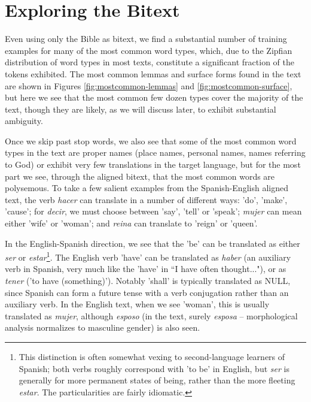 \section{Exploring the Bitext}
\label{sec:exploring}
Even using only the Bible as bitext, we find a substantial number of
training examples for many of the most common word types, which, due to the
Zipfian distribution of word types in most texts, constitute a significant
fraction of the tokens exhibited.
The most common lemmas and surface forms found in the text are shown in Figures
\ref{fig:mostcommon-lemmas} and \ref{fig:mostcommon-surface}, but here we see
that the most common few dozen types cover the majority of the text, though
they are likely, as we will discuss later, to exhibit substantial ambiguity.

Once we skip past stop words, we also see that some of the most common word
types in the text are proper names (place names, personal names, names
referring to God) or exhibit very few translations in the target language, but
for the most part we see, through the aligned bitext, that the most common
words are polysemous.  To take a few salient examples from the Spanish-English
aligned text, the verb \emph{hacer} can translate in a number of different
ways: 'do', 'make', 'cause'; for \emph{decir}, we must choose between 'say',
'tell' or 'speak'; \emph{mujer} can mean either 'wife' or 'woman'; and
\emph{reina} can translate to 'reign' or 'queen'.

In the English-Spanish direction, we see that the 'be' can be translated as
either \emph{ser} or \emph{estar}\footnote{This distinction is often somewhat
vexing to second-language learners of Spanish; both verbs roughly correspond
with 'to be' in English, but \emph{ser} is generally for more permanent states
of being, rather than the more fleeting \emph{estar}. The particularities are
fairly idiomatic.}. The English verb 'have' can be translated as \emph{haber}
(an auxiliary verb in Spanish, very much like the 'have' in ``I have often
thought..."), or as \emph{tener} ('to have (something)'). Notably 'shall' is
typically translated as NULL, since Spanish can form a future tense with a verb
conjugation rather than an auxiliary verb. In the English text, when we see
'woman', this is usually translated as \emph{mujer}, although \emph{esposo} (in
the text, surely \emph{esposa} -- morphological analysis normalizes to
masculine gender) is also seen.


